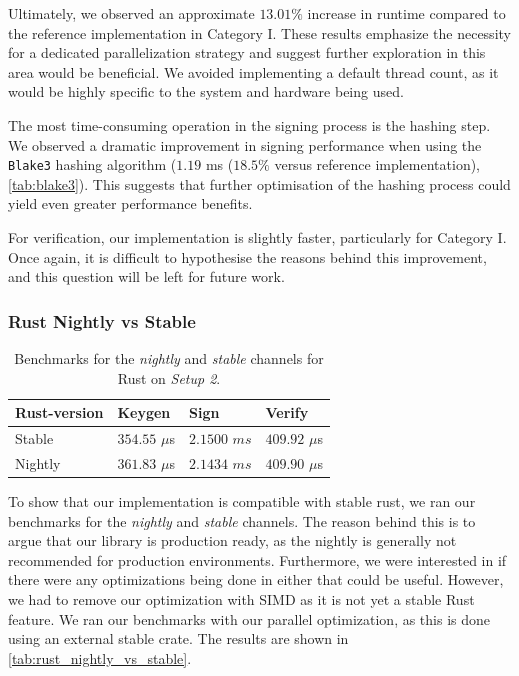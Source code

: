 \documentclass[11pt]{report}
\theoremstyle{definition}
\theoremstyle{plain}
\begin{document}
Ultimately, we observed an approximate $13.01\%$ increase in runtime compared to the reference implementation in Category I. These results emphasize the necessity for a dedicated parallelization strategy and suggest further exploration in this area would be beneficial. We avoided implementing a default thread count, as it would be highly specific to the system and hardware being used.

The most time-consuming operation in the signing process is the hashing step. We observed a dramatic improvement in signing performance when using the \texttt{Blake3} hashing algorithm ($1.19$ ms ($18.5\%$ versus reference implementation), \autoref{tab:blake3}). This suggests that further optimisation of the hashing process could yield even greater performance benefits.

For verification, our implementation is slightly faster, particularly for Category I. Once again, it is difficult to hypothesise the reasons behind this improvement, and this question will be left for future work.

\subsubsection{Rust Nightly vs Stable}

\begin{table}[H]
  \centering
  \begin{tabular}{l|lll}
    \hline
    Rust-version & Keygen          & Sign          & Verify          \\
    \hline
    Stable       & $354.55$ $\mu$s & $2.1500$ $ms$ & $409.92$ $\mu$s \\
    Nightly      & $361.83$ $\mu$s & $2.1434$ $ms$ & $409.90$ $\mu$s \\
    \hline
  \end{tabular}
  \caption{Benchmarks for the \textit{nightly} and \textit{stable} channels for Rust on \textit{Setup 2}.}
  \label{tab:rust_nightly_vs_stable}
\end{table}

To show that our implementation is compatible with stable rust, we ran our benchmarks for the \textit{nightly} and \textit{stable} channels. The reason behind this is to argue that our library is production ready, as the nightly is generally not recommended for production environments. Furthermore, we were interested in if there were any optimizations being done in either that could be useful. However, we had to remove our optimization with SIMD as it is not yet a stable Rust feature. We ran our benchmarks with our parallel optimization, as this is done using an external stable crate. The results are shown in \autoref{tab:rust_nightly_vs_stable}.
\end{document}
